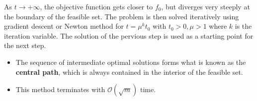 As $t \to +\infty$, the objective function gets closer to $f_0$, but diverges very steeply at the boundary of the feasible set.
\newpar{}
The problem is then solved iteratively using gradient descent or Newton method for $t=\mu^k t_0$ with $t_0>0, \mu > 1$ where $k$ is the iteration variable. The solution of the pervious step is used as a starting point for the next step.

\newpar{}
\begin{itemize}
    \item The sequence of intermediate optimal solutions forms what is known as the \textbf{central path}, which is always contained in the interior of the feasible set.
    \item This method terminates with $\mathcal{O}(\sqrt{m})$ time.
\end{itemize}

